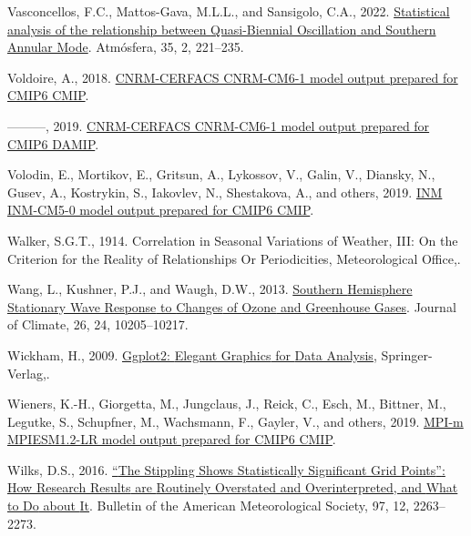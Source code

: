 \documentclass[12pt,oneside]{reedthesis}
\newlength{\cslhangindent}
\newenvironment{CSLReferences}[2] %
 {%
  \setlength{\parindent}{0pt}
  \ifodd #1 \everypar{\setlength{\hangindent}{\cslhangindent}}\ignorespaces\fi
  \ifnum #2 > 0
  \setlength{\parskip}{#2\baselineskip}
  \fi
 }%
 {}
\begin{document}
\begin{CSLReferences}{1}{0}
\leavevmode{}%
Vasconcellos, F.C., Mattos-Gava, M.L.L., and Sansigolo, C.A., 2022. \href{https://doi.org/10.20937/ATM.52910}{Statistical analysis of the relationship between {Quasi-Biennial Oscillation} and {Southern Annular Mode}}. Atmósfera, 35, 2, 221--235.

\leavevmode{}%
Voldoire, A., 2018. \href{https://doi.org/10.22033/ESGF/CMIP6.1375}{CNRM-CERFACS CNRM-CM6-1 model output prepared for CMIP6 CMIP}.

\leavevmode{}%
---------, 2019. \href{https://doi.org/10.22033/ESGF/CMIP6.1376}{CNRM-CERFACS CNRM-CM6-1 model output prepared for CMIP6 DAMIP}.

\leavevmode{}%
Volodin, E., Mortikov, E., Gritsun, A., Lykossov, V., Galin, V., Diansky, N., Gusev, A., Kostrykin, S., Iakovlev, N., Shestakova, A., and others, 2019. \href{https://doi.org/10.22033/ESGF/CMIP6.1423}{INM INM-CM5-0 model output prepared for CMIP6 CMIP}.

\leavevmode{}%
Walker, S.G.T., 1914. Correlation in {Seasonal Variations} of {Weather}, {III}: {On} the {Criterion} for the {Reality} of {Relationships Or Periodicities}, {Meteorological Office},.

\leavevmode{}%
Wang, L., Kushner, P.J., and Waugh, D.W., 2013. \href{https://doi.org/10.1175/JCLI-D-13-00160.1}{Southern {Hemisphere Stationary Wave Response} to {Changes} of {Ozone} and {Greenhouse Gases}}. Journal of Climate, 26, 24, 10205--10217.

\leavevmode{}%
Wickham, H., 2009. \href{https://doi.org/10.1007/978-0-387-98141-3}{Ggplot2: {Elegant Graphics} for {Data Analysis}}, {Springer-Verlag},.

\leavevmode{}%
Wieners, K.-H., Giorgetta, M., Jungclaus, J., Reick, C., Esch, M., Bittner, M., Legutke, S., Schupfner, M., Wachsmann, F., Gayler, V., and others, 2019. \href{https://doi.org/10.22033/ESGF/CMIP6.742}{MPI-m MPIESM1.2-LR model output prepared for CMIP6 CMIP}.

\leavevmode{}%
Wilks, D.S., 2016. \href{https://doi.org/10.1175/BAMS-D-15-00267.1}{{``{The Stippling Shows Statistically Significant Grid Points}''}: {How Research Results} are {Routinely Overstated} and {Overinterpreted}, and {What} to {Do} about {It}}. Bulletin of the American Meteorological Society, 97, 12, 2263--2273.


\end{CSLReferences}
\end{document}
